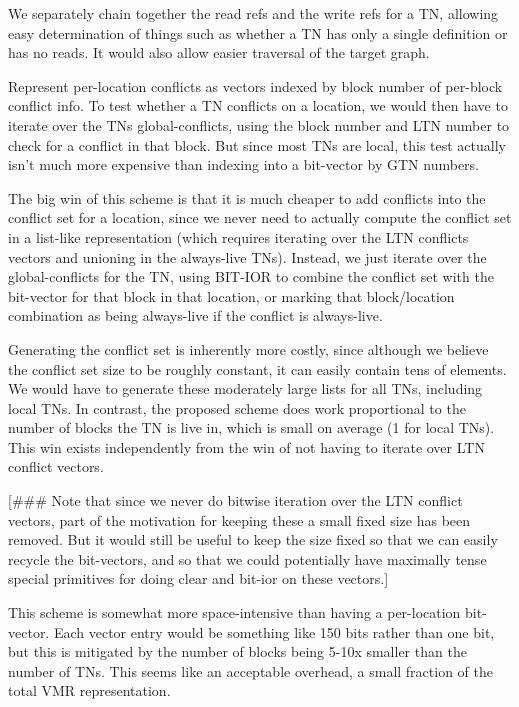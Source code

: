 We separately chain together the read refs and the write refs for a TN,
allowing easy determination of things such as whether a TN has only a single
definition or has no reads.  It would also allow easier traversal of the target
graph.
 
Represent per-location conflicts as vectors indexed by block number of
per-block conflict info.  To test whether a TN conflicts on a location, we
would then have to iterate over the TNs global-conflicts, using the block
number and LTN number to check for a conflict in that block.  But since most
TNs are local, this test actually isn't much more expensive than indexing into
a bit-vector by GTN numbers.

The big win of this scheme is that it is much cheaper to add conflicts into the
conflict set for a location, since we never need to actually compute the
conflict set in a list-like representation (which requires iterating over the
LTN conflicts vectors and unioning in the always-live TNs).  Instead, we just
iterate over the global-conflicts for the TN, using BIT-IOR to combine the
conflict set with the bit-vector for that block in that location, or marking
that block/location combination as being always-live if the conflict is
always-live.

Generating the conflict set is inherently more costly, since although we
believe the conflict set size to be roughly constant, it can easily contain
tens of elements.  We would have to generate these moderately large lists for
all TNs, including local TNs.  In contrast, the proposed scheme does work
proportional to the number of blocks the TN is live in, which is small on
average (1 for local TNs).  This win exists independently from the win of not
having to iterate over LTN conflict vectors.


[\#\#\# Note that since we never do bitwise iteration over the LTN conflict
vectors, part of the motivation for keeping these a small fixed size has been
removed.  But it would still be useful to keep the size fixed so that we can
easily recycle the bit-vectors, and so that we could potentially have maximally
tense special primitives for doing clear and bit-ior on these vectors.]

This scheme is somewhat more space-intensive than having a per-location
bit-vector.  Each vector entry would be something like 150 bits rather than one
bit, but this is mitigated by the number of blocks being 5-10x smaller than the
number of TNs.  This seems like an acceptable overhead, a small fraction of the
total VMR representation.

